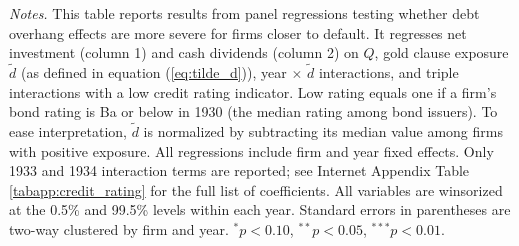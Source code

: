\begin{table}[p]
    \vspace*{3mm} \justifying \noindent
\scriptsize{\textit{Notes.} This table reports results from panel regressions testing whether debt overhang effects are more severe for firms closer to default. It regresses net investment (column 1) and cash dividends (column 2) on $Q$, gold clause exposure $\tilde{d}$ (as defined in equation (\ref{eq:tilde_d})), year $\times$ $\tilde{d}$ interactions, and triple interactions with a low credit rating indicator. Low rating equals one if a firm's bond rating is Ba or below in 1930 (the median rating among bond issuers). To ease interpretation, $\tilde{d}$ is normalized by subtracting its median value among firms with positive exposure. All regressions include firm and year fixed effects. Only 1933 and 1934 interaction terms are reported; see Internet Appendix Table \ref{tabapp:credit_rating} for the full list of coefficients. All variables are winsorized at the 0.5\% and 99.5\% levels within each year. Standard errors in parentheses are two-way clustered by firm and year. $^{*}p<0.10$, $^{**}p<0.05$, $^{***}p<0.01$.}
\end{table}
